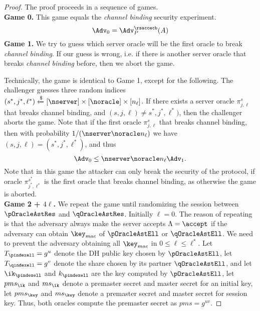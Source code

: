 \begin{proof}
 The proof proceeds in a sequence of games. \vspace{10pt}\\
 \textbf{Game 0.} This game equals the \textit{channel binding} security experiment.
 \begin{equation}
  \Adv_0 = \Adv^{\rsaccecb}_{P}(A)
 \end{equation}%
%
%
 \textbf{Game 1.} We try to guess which server oracle will be the first oracle to break \textit{channel binding}. If our guess is wrong, i.e. if there is another server oracle that breaks \textit{channel binding} before, then we abort the game.

 Technically, the game is identical to Game 1, except for the following. The challenger guesses three random indices $(s^{\ast}, j^{\ast}, \ell^{\ast}) \xleftarrow{\$} [\nserver] \times [\noracle] \times [n_{\ell}]$. If there exists a server oracle $\pi^s_{j,\ell}$ that breaks channel binding, and $(s, j, \ell) \neq s^{\ast}, j^{\ast}, \ell^{\ast})$, then the challenger aborts the game. Note that if the first oracle $\pi^s_{j,\ell}$ that breaks channel binding, then with probability $1/(\nserver \noracle n_{\ell})$ we have $(s,j,\ell) = (s^{\ast}, j^{\ast}, \ell^{\ast})$, and thus
 \begin{equation}
  \Adv_0 \leq \nserver \noracle n_{\ell} \Adv_1.
 \end{equation}%
 Note that in this game the attacker can only break the security of the protocol, if oracle $\pi^{s^{\ast}}_{j^{\ast},\ell^{\ast}}$ is the first oracle that breaks channel binding, as otherwise the game is aborted.
\vspace{10pt}\\%
%
%
 \textbf{Game 2 + $4\ell$.} We repeat the game until randomizing the session between $\pOracleAstRes$ and $\qOracleAstRes$. Initially $\ell = 0$. The reason of repeating is that the adversary always make the server accepts $\Lambda = \accept$ if the adversary can obtain $\key_{mac}$ of $\pOracleAstEll$ or $\qOracleAstEll$. We need to prevent the adversary obtaining all $\key_{mac}$ in $ 0 \leq \ell \leq \ell^{\ast}$.
 Let $T_{\pindexell} = g^u$ denote the DH public key chosen by $\pOracleAstEll$, let $T_{\qindexell} = g^v$ denote the share chosen by its partner $\qOracleAstEll$, and let $\ik_{\pindexell}$ and $k_{\pindexell}$ are the key computed by $\pOracleAstEll$, let $pms_{\ik}$ and $ms_{\ik}$ denote a premaster secret and master secret for an initial key, let $pms_{\key}$ and $ms_{\key}$ denote a premaster secret and master secret for session key. Thus, both oracles compute the premaster secret as $pms = g^{uv}$.


\end{proof}
